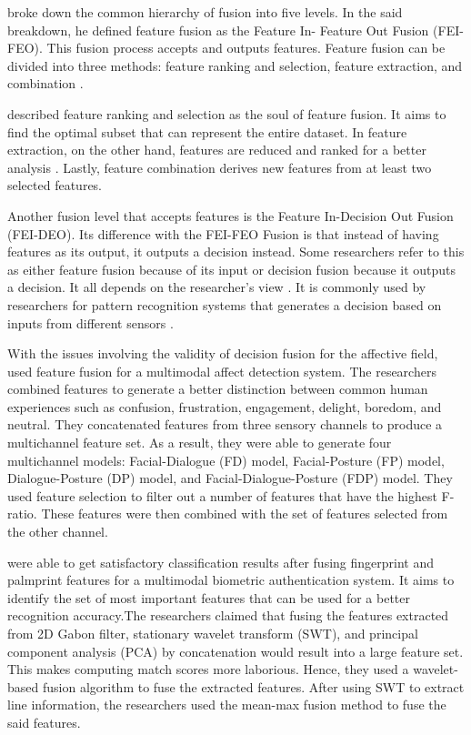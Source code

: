  broke down the common hierarchy of fusion into five levels. In the said breakdown, he defined feature fusion as the Feature In- Feature Out Fusion (FEI-FEO). This fusion process accepts and outputs features. Feature fusion can be divided into three methods:  feature ranking and selection, feature extraction, and combination .

 described feature ranking and selection as the soul of feature fusion. It aims to find the optimal subset that can represent the entire dataset. In feature extraction, on the other hand, features are reduced and ranked for a better analysis . Lastly, feature combination derives new features from at least two selected features.

Another fusion level that accepts features is the Feature In-Decision Out Fusion (FEI-DEO). Its difference with the FEI-FEO Fusion is that instead of having features as its output, it outputs a decision instead. Some researchers refer to this as either feature fusion because of its input or decision fusion because it outputs a decision. It all depends on the researcher’s view  . It is commonly used by researchers for pattern recognition systems that generates a decision based on inputs from different sensors .

With the issues involving the validity of decision fusion for the affective field,  used feature fusion for a multimodal affect detection system. The researchers combined features to generate a better distinction between common human experiences such as confusion, frustration, engagement, delight, boredom, and neutral. They concatenated features from three sensory channels to produce a multichannel feature set. As a result, they were able to generate four multichannel models: Facial-Dialogue (FD) model, Facial-Posture (FP) model, Dialogue-Posture (DP) model, and Facial-Dialogue-Posture (FDP) model. They used feature selection to filter out a number of features that have the highest F-ratio. These features were then combined with the set of features selected from the other channel. 

 were able to get satisfactory classification results after fusing fingerprint and palmprint features for a multimodal biometric authentication system. It aims to identify the set of most important features that can be used for a better recognition accuracy.The researchers claimed that fusing the features extracted from 2D Gabon  filter, stationary wavelet transform (SWT), and principal component analysis (PCA) by concatenation would result into a large feature set. This makes computing match scores more laborious. Hence, they used a wavelet-based fusion algorithm to fuse the extracted features. After using SWT to extract line information, the researchers used the mean-max fusion method to fuse the said features.


